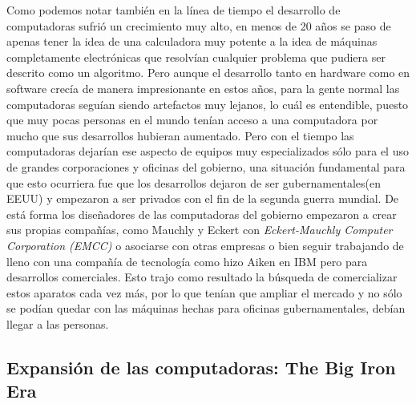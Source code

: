 \documentclass[letterpaper,12pt,oneside]{book}
\begin{document}
		
		
		Como podemos notar también en la línea de tiempo el desarrollo de computadoras sufrió un crecimiento muy alto, en menos de 20 años se paso de apenas tener la idea
		de una calculadora muy potente a la idea de máquinas completamente electrónicas que resolvían cualquier problema
		que pudiera ser descrito como un algoritmo. Pero aunque el desarrollo tanto en hardware como en software crecía de manera impresionante en
		estos años, para la gente normal las computadoras seguían siendo artefactos muy lejanos, lo cuál es entendible, puesto que
		muy pocas personas en el mundo tenían acceso a una computadora por mucho que sus desarrollos hubieran aumentado. Pero con el tiempo las computadoras
		dejarían ese aspecto de equipos muy especializados sólo para el uso de grandes corporaciones y oficinas del gobierno, una situación fundamental
		para que esto ocurriera fue que los desarrollos dejaron de ser gubernamentales(en EEUU) y empezaron a ser privados con el fin de la segunda guerra mundial.
		De está forma los diseñadores de las computadoras del gobierno empezaron a crear sus propias compañías, como Mauchly y Eckert
		con \textit{Eckert-Mauchly Computer Corporation (EMCC)} o asociarse con otras empresas o bien seguir trabajando de lleno con una compañía de tecnología como
		hizo Aiken en IBM pero para desarrollos comerciales. Esto trajo como resultado la búsqueda de comercializar estos aparatos cada vez más, por lo que tenían que ampliar 
		el mercado y no sólo
		se podían quedar con las máquinas hechas para oficinas gubernamentales, debían llegar a las personas.
		
		
		\clearpage
		
		\subsection{Expansión de las computadoras: The Big Iron Era}
		
		
\end{document}
